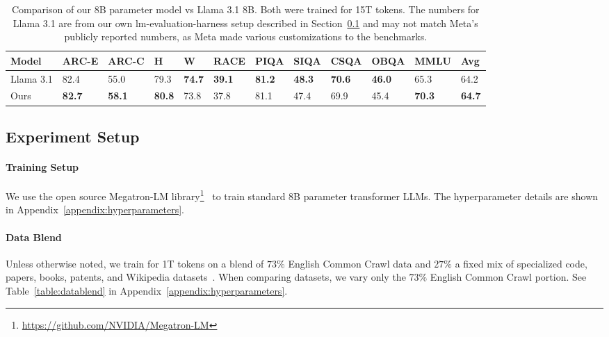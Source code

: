 \documentclass[11pt]{article}
\begin{document}
\begin{table}[!hbt]\small\centering
\begin{tabularx}{\textwidth}{Xlllllllllll}
\toprule
\textbf{Model}        & \textbf{ARC-E} & \textbf{ARC-C} & \textbf{H}    & \textbf{W}    & \textbf{RACE} & \textbf{PIQA} & \textbf{SIQA} & \textbf{CSQA} & \textbf{OBQA} & \textbf{MMLU} & \textbf{Avg}       \\ \midrule
Llama 3.1 & 82.4          & 55.0          & 79.3          & \textbf{74.7} & \textbf{39.1} & \textbf{81.2} & \textbf{48.3} & \textbf{70.6} & \textbf{46.0} & 65.3          & 64.2          \\
Ours       & \textbf{82.7} & \textbf{58.1} & \textbf{80.8} & 73.8          & 37.8          & 81.1          & 47.4          & 69.9          & 45.4          & \textbf{70.3} & \textbf{64.7} \\ \bottomrule
\end{tabularx}
\caption{Comparison of our 8B parameter model vs Llama 3.1 8B. Both were trained for 15T tokens. The numbers for Llama 3.1 are from our own lm-evaluation-harness setup described in Section~\ref{section:experiment-setup} and may not match Meta's publicly reported numbers, as Meta made various customizations to the benchmarks.}
\label{table:8b-15t}
\end{table}

\subsection{Experiment Setup}
\label{section:experiment-setup}

\paragraph{Training Setup} We use the open source Megatron-LM library\footnote{\url{https://github.com/NVIDIA/Megatron-LM}}~\citep{shoeybi2019megatron} to train standard 8B parameter transformer LLMs. The hyperparameter details are shown in Appendix~\ref{appendix:hyperparameters}.

\paragraph{Data Blend} Unless otherwise noted, we train for 1T tokens on a blend of $73\%$ English Common Crawl data and $27\%$ a fixed mix of specialized code, papers, books, patents, and Wikipedia datasets~\citep{adler2024nemotron}. When comparing datasets, we vary only the $73\%$ English Common Crawl portion. See Table~\ref{table:datablend} in Appendix~\ref{appendix:hyperparameters}.
\end{document}
